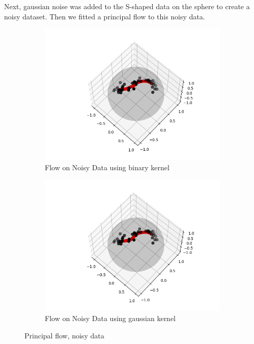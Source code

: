 \documentclass[12pt]{report}
\begin{document}
Next, gaussian noise was added to the S-shaped data on the sphere to create a noisy dataset.
Then we fitted a principal flow to this noisy data.

\begin{figure}[ht]
\centering
\begin{subfigure}{.5\textwidth}
    \centering
    \includegraphics[scale=0.5]{noisy_13_binary.png}
    \caption{Flow on Noisy Data using binary kernel}
    \label{noisybinary}
\end{subfigure}%
\begin{subfigure}{.5\textwidth}
    \centering
    \includegraphics[scale=0.5]{noisy_13_gaussian.png}
    \caption{Flow on Noisy Data using gaussian kernel}
    \label{noisygaussian}
\end{subfigure}
\caption{Principal flow, noisy data}
\label{fig:noisyflows}
\end{figure}
\end{document}
